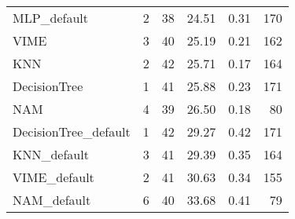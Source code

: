\begin{tabular}{lrrrrr}
MLP_default                &                  2 &  38 &  24.51 &                           0.31 &   170 \\
VIME                       &                  3 &  40 &  25.19 &                           0.21 &   162 \\
KNN                        &                  2 &  42 &  25.71 &                           0.17 &   164 \\
DecisionTree               &                  1 &  41 &  25.88 &                           0.23 &   171 \\
NAM                        &                  4 &  39 &  26.50 &                           0.18 &    80 \\
DecisionTree_default       &                  1 &  42 &  29.27 &                           0.42 &   171 \\
KNN_default                &                  3 &  41 &  29.39 &                           0.35 &   164 \\
VIME_default               &                  2 &  41 &  30.63 &                           0.34 &   155 \\
NAM_default                &                  6 &  40 &  33.68 &                           0.41 &    79 \\
\bottomrule
\end{tabular}
